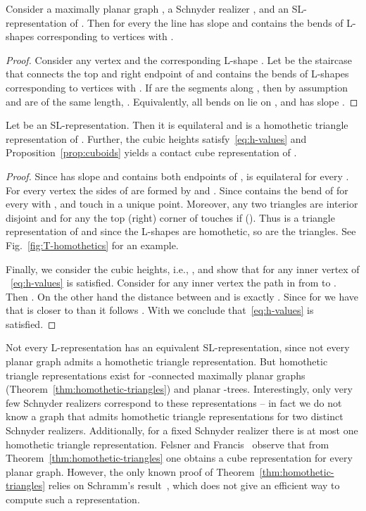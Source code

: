 \documentclass{llncs}
\begin{document}
\begin{lemma}\label{lem:overconstrained}
 Consider a maximally planar graph , a Schnyder realizer , and an SL-representation of . Then for every  the line  has slope  and contains the bends of L-shapes corresponding to vertices  with .
\end{lemma}
\begin{proof}
 Consider any vertex  and the corresponding L-shape . Let  be the staircase that connects the top and right endpoint of  and contains the bends of L-shapes corresponding to vertices  with . If  are the segments along , then by assumption  and  are of the same length, . Equivalently, all bends on  lie on , and  has slope .
\end{proof}


\begin{corollary}\label{cor:overconstrained}
 Let  be an SL-representation. Then it is equilateral and  is a homothetic triangle representation of . Further, the cubic heights satisfy~\eqref{eq:h-values} and Proposition~\ref{prop:cuboids} yields a contact cube representation of .
\end{corollary}

\begin{proof}
 Since  has slope  and contains both endpoints of ,  is equilateral for every .
For every vertex  the sides of  are formed by  and . Since  contains the bend of  for every  with ,  and  touch in a unique point. Moreover, any two triangles are interior disjoint and for any  the top (right) corner of  touches  if  (). Thus  is a triangle representation of  and since the L-shapes are homothetic, so are the triangles. See Fig.~\ref{fig:T-homothetics} for an example.

 Finally, we consider the cubic heights, i.e., , and show that for any inner vertex  of ~\eqref{eq:h-values} is satisfied. Consider for any inner vertex  the path  in  from  to . Then . On the other hand the distance between  and  is exactly . Since for  we have that  is closer to  than  it follows . With  we conclude that~\eqref{eq:h-values} is satisfied.
\end{proof}


Not every L-representation has an equivalent SL-representation, since not every planar graph admits a homothetic triangle representation. But homothetic triangle representations exist for -connected maximally planar graphs (Theorem~\ref{thm:homothetic-triangles}) and planar -trees. 
Interestingly, only very few Schnyder realizers correspond to these representations -- in fact we do not know a graph that admits homothetic triangle representations for two distinct Schnyder realizers. Additionally, for a fixed Schnyder realizer there is at most one homothetic triangle representation.
Felsner and Francis~\cite{Felsner11} observe that from Theorem~\ref{thm:homothetic-triangles} one obtains a cube representation for every planar graph. However, the only known proof of Theorem~\ref{thm:homothetic-triangles} relies on Schramm's result~\cite{schramm2007combinatorically}, which does not give an efficient way to compute such a representation. 
\end{document}
